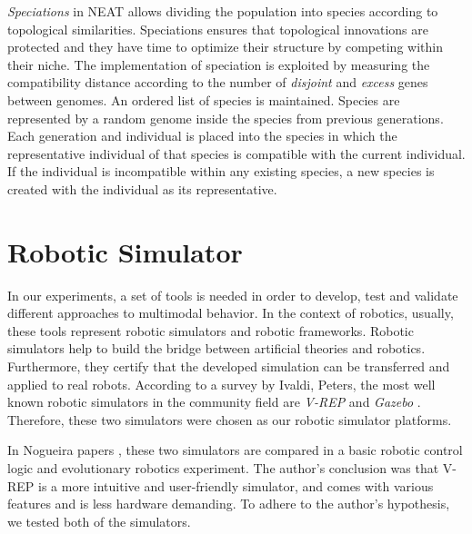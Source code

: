 \documentclass[format=acmsmall, review=false, screen=true]{acmart}
\begin{document}
\emph{Speciations} in NEAT allows dividing the population into species according to topological similarities. Speciations ensures that topological innovations are protected and they have time to optimize their structure by competing within their niche. The implementation of speciation is exploited by measuring the compatibility distance according to the number of \emph{disjoint} and \emph{excess} genes between genomes. An ordered list of species is maintained. Species are represented by a random genome inside the species from previous generations. Each generation and individual is placed into the species in which the representative individual of that species is compatible with the current individual. If the individual is incompatible within any existing species, a new species is created with the individual as its representative. 


\section{Robotic Simulator}

In our experiments, a set of tools is needed in order to develop, test and validate different approaches to multimodal behavior. In the context of robotics, usually, these tools represent robotic simulators and robotic frameworks. Robotic simulators help to build the bridge between artificial theories and robotics. Furthermore, they certify that the developed simulation can be transferred and applied to real robots. According to a survey \cite{ivaldi2014tools} by Ivaldi, Peters, the most well known robotic simulators in the community field are \emph{V-REP} \cite{rohmer2013v} and \emph{Gazebo} \cite{koenig2004design}. Therefore, these two simulators were chosen as our robotic simulator platforms.

In Nogueira papers \cite{nogueira2014comparative}, these two simulators are compared in a basic robotic control logic and evolutionary robotics experiment. The author's conclusion was that V-REP is a more intuitive and user-friendly simulator, and comes with various features and is less hardware demanding. To adhere to the author's hypothesis, we tested both of the simulators.
\end{document}
